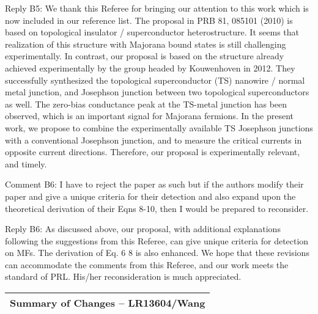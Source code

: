 \documentclass[11pt]{article}
\begin{document}
Reply B5: We thank this Referee for bringing our attention to this work
which is now included in our reference list. The proposal in PRB 81,
085101 (2010) is based on topological insulator / superconductor
heterostructure. It seems that realization of this structure with
Majorana bound states is still challenging experimentally. In contrast,
our proposal is based on the structure already achieved experimentally
by the group headed by Kouwenhoven in 2012. They successfully
synthesized the topological superconductor (TS) nanowire / normal metal
junction, and Josephson junction between two topological superconductors
as well. The zero-bias conductance peak at the TS-metal junction has
been observed, which is an important signal for Majorana fermions. In
the present work, we propose to combine the experimentally available TS
Josephson junctions with a conventional Josephson junction, and to
measure the critical currents in opposite current directions. Therefore,
our proposal is experimentally relevant, and timely.

Comment B6: I have to reject the paper as such but if the authors modify
their paper and give a unique criteria for their detection and also
expand upon the theoretical derivation of their Eqns 8-10, then I would
be prepared to reconsider.

Reply B6: As discussed above, our proposal, with additional explanations
following the suggestions from this Referee, can give unique criteria
for detection on MFs. The derivation of Eq. 6 8 is also enhanced. We
hope that these revisions can accommodate the comments from this
Referee, and our work meets the standard of PRL. His/her reconsideration
is much appreciated.

\begin{longtable}[]{@{}l@{}}
\toprule
\endhead
Summary of Changes -- LR13604/Wang\tabularnewline
\bottomrule
\end{longtable}
\end{document}
